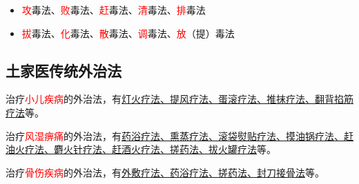 \documentclass[cn,blue,12pt,normal,founder]{elegantnote}
\newcommand{\redt}[1]{\textcolor{red}{{}#1}}      %
\begin{document}
\begin{itemize}
  \item \redt{攻}毒法、\redt{败}毒法、\redt{赶}毒法、\redt{清}毒法、\redt{排}毒法
  \item \redt{拔}毒法、\redt{化}毒法、\redt{散}毒法、\redt{调}毒法、\redt{放}（提）毒法
\end{itemize}

\subsection{土家医传统外治法}

治疗\redt{小儿疾病}的外治法，有\uline{灯火疗法、提风疗法、蛋滚疗法、推抹疗法、翻背掐筋} \\ \uline{疗法}等。

治疗\redt{风湿痹痛}的外治法，有\uline{药浴疗法、熏蒸疗法、滚袋熨贴疗法、摸油锅疗法、赶} \\ \uline{油火疗法、麝火针疗法、赶酒火疗法、搓药法、拔火罐疗法}等。

治疗\redt{骨伤疾病}的外治法，有\uline{外敷疗法、药浴疗法、搓药法、封刀接骨法}等。
\end{document}
